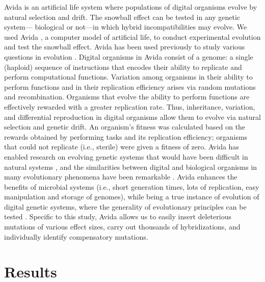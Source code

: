 \documentclass{article}
\begin{document}
Avida \cite{ofr04} is an artificial life system
where populations of digital organisms
evolve by natural selection and drift.
The snowball effect can be tested in any genetic system---%
biological or not---in which hybrid incompatibilities may evolve.
%
We used Avida \cite{ofr04}, a computer model of artificial life,
to conduct experimental evolution and test the snowball effect.
%
Avida has been used previously to study various questions in evolution
\cite{len99,len03,cho04,mis06,ele07,ele08,mis10}.
%
Digital organisms in Avida consist of a genome:
a single (haploid) sequence of instructions that encodes
their ability to replicate and perform computational functions.
%
Variation among organisms in their ability to perform functions
and in their replication efficiency
arises via random mutations and recombination.
%
Organisms that evolve the ability to perform functions
are effectively rewarded with a greater replication rate.
%
Thus, inheritance, variation, and differential reproduction
in digital organisms allow them to evolve
via natural selection and genetic drift.
%
An organism's fitness was calculated based on the rewards
obtained by performing tasks and its replication efficiency;
organisms that could not replicate (i.e., sterile)
were given a fitness of zero.
%
Avida has enabled research on evolving genetic systems
that would have been difficult in natural systems \cite{ada06},
and the similarities between digital and biological organisms
in many evolutionary phenomena have been remarkable \cite{wil02,ada06}.
%
Avida enhances the benefits of microbial systems
(i.e., short generation times, lots of replication,
easy manipulation and storage of genomes),
while being a true instance of evolution of digital genetic systems,
where the generality of evolutionary principles can be tested
\cite{len99,ele08,mis06}.
%
Specific to this study, Avida allows us to easily insert deleterious mutations
of various effect sizes, carry out thousands of hybridizations,
and individually identify compensatory mutations.



\section*{Results}
\end{document}
